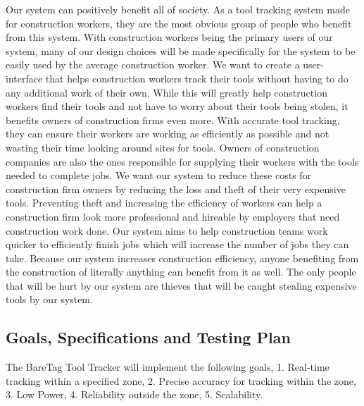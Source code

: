 \documentclass[conference]{IEEEtran}
\begin{document}
Our system can positively benefit all of society. As a tool tracking 
system made for construction workers, they are the most obvious group 
of people who benefit from this system. With construction workers being 
the primary users of our system, many of our design choices will be made 
specifically for the system to be easily used by the average construction 
worker. We want to create a user-interface that helps construction workers 
track their tools without having to do any additional work of their own. 
While this will greatly help construction workers find their tools and 
not have to worry about their tools being stolen, it benefits owners of 
construction firms even more. With accurate tool tracking, they can 
ensure their workers are working as efficiently as possible and not 
wasting their time looking around sites for tools. Owners of construction 
companies are also the ones responsible for supplying their workers with 
the tools needed to complete jobs. We want our system to reduce these 
costs for construction firm owners by reducing the loss and theft of 
their very expensive tools. Preventing theft and increasing the 
efficiency of workers can help a construction firm look more professional 
and hireable by employers that need construction work done. Our system 
aims to help construction teams work quicker to efficiently finish jobs 
which will increase the number of jobs they can take. Because our system 
increases construction efficiency, anyone benefiting from the construction 
of literally anything can benefit from it as well. The only people that 
will be hurt by our system are thieves that will be caught stealing 
expensive tools by our system.

\subsection{Goals, Specifications and Testing Plan}

The BareTag Tool Tracker will implement the following goals, 1. Real-time 
tracking within a specified zone, 2. Precise accuracy for tracking within 
the zone, 3. Low Power,  4. Reliability outside the zone, 5. Scalability.
\end{document}

